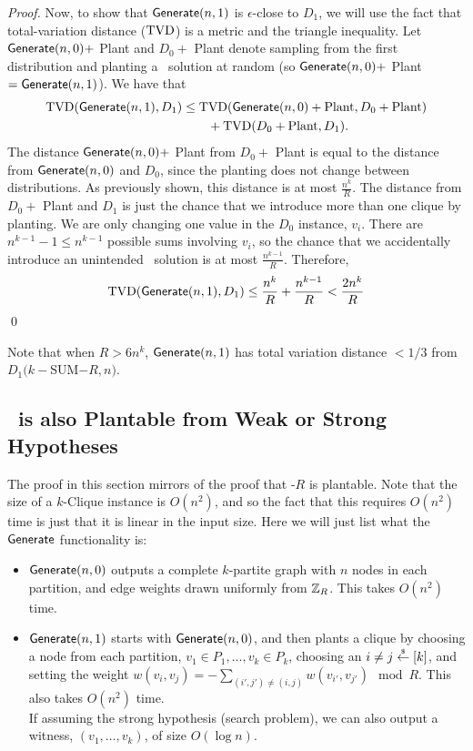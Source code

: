 \begin{proof}
	Now, to show that $\mathsf{Generate}(n,1)$ is $\epsilon$-close to $D_1$, we will use the fact that total-variation distance ($\mathrm{TVD}$) is a metric and the triangle inequality. Let $\mathsf{Generate}(n,0) +$ Plant and $D_0 + $ Plant denote sampling from the first distribution and planting a \kSum~solution at random (so $\mathsf{Generate}(n,0) +$ Plant $= \mathsf{Generate}(n,1)$). We have that
	\begin{align*}
	\mathrm{TVD}(\mathsf{Generate}(n,1), D_1) &\le \mathrm{TVD}(\mathsf{Generate}(n,0) + \mbox{Plant}, D_0 + \mbox{Plant})\\
	&\qquad + \mathrm{TVD}(D_0 + \mbox{Plant}, D_1).
	\end{align*}
	The distance $\mathsf{Generate}(n,0) +$ Plant from $D_0 + $ Plant is equal to the distance from $\mathsf{Generate}(n,0)$ and $D_0$, since the planting does not change between distributions. As previously shown, this distance is at most $\frac{n^k}{R}$. The distance from $D_0 +$ Plant and $D_1$ is just the chance that we introduce more than one clique by planting. We are only changing one value in the $D_0$ instance, $v_i$. There are $n^{k-1} - 1 \le n^{k-1}$ possible sums involving $v_i$, so the chance that we accidentally introduce an unintended \kSum~solution is at most $\frac{n^{k-1}}{R}$. Therefore,
	\[\mathrm{TVD}(\mathsf{Generate}(n,1), D_1) \le \frac{n^k}{R} + \frac{n^{k-1}}{R} < \frac{2n^k}{R}\] \qed
\end{proof}

Note that when $R > 6n^k$, $\mathsf{Generate}(n,1)$ has total variation distance $< 1/3$ from $D_1(k-$SUM$-R,n)$.

\subsection{\zkclique~is also Plantable from Weak or Strong Hypotheses}
The proof in this section mirrors of the proof that \kSum-$R$ is plantable. Note that the size of a $k$-Clique instance is $O(n^2)$, and so the fact that this requires $O(n^2)$ time is just that it is linear in the input size. Here we will just list what the $\mathsf{Generate}$ functionality is:
\begin{itemize}
	\item $\mathsf{Generate}(n,0)$ outputs a complete $k$-partite graph with $n$ nodes in each partition, and edge weights drawn uniformly from $\mathbb{Z}_R$. This takes $O(n^2)$ time.
	\item $\mathsf{Generate}(n,1)$ starts with $\mathsf{Generate}(n,0)$, and then plants a clique by choosing a node from each partition, $v_1 \in P_1, \dots, v_k \in P_k$, choosing an $i \neq j \stackrel{\scriptscriptstyle{\$}}{\gets} [k]$, and setting the weight $w(v_i, v_j) = -\sum_{(i', j') \neq (i,j)} w(v_{i'}, v_{j'}) \mod R$. This also takes $O(n^2)$ time.\\
	If assuming the strong hypothesis (search problem), we can also output a witness, $(v_1,\ldots, v_k)$, of size $O(\log n)$.
\end{itemize}

